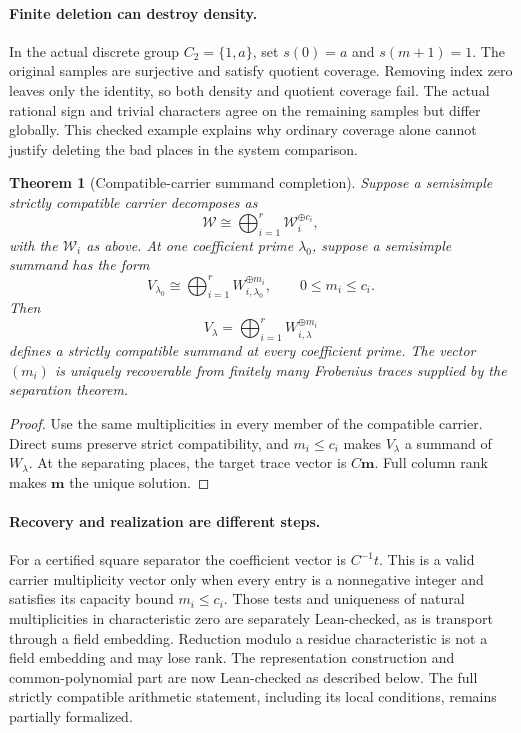\documentclass[11pt]{article}
\newtheorem{theorem}{Theorem}[section]
\theoremstyle{definition}
\theoremstyle{remark}
\begin{document}
\paragraph{Finite deletion can destroy density.}
In the actual discrete group $C_2=\{1,a\}$, set $s(0)=a$ and $s(m+1)=1$.
The original samples are surjective and satisfy quotient coverage. Removing
index zero leaves only the identity, so both density and quotient coverage fail.
The actual rational sign and trivial characters agree on the remaining samples
but differ globally. This checked example explains why ordinary coverage alone
cannot justify deleting the bad places in the system comparison.

\begin{theorem}[Compatible-carrier summand completion]
Suppose a semisimple strictly compatible carrier decomposes as
\[
\mathscr W
\cong
\bigoplus_{i=1}^{r}
\mathscr W_i^{\oplus c_i},
\]
with the \(\mathscr W_i\) as above.  At one coefficient prime \(\lambda_0\), suppose a semisimple summand has the form
\[
V_{\lambda_0}
\cong
\bigoplus_{i=1}^{r}
W_{i,\lambda_0}^{\oplus m_i},
\qquad
0\le m_i\le c_i.
\]
Then
\[
\boxed{
V_\lambda
=
\bigoplus_{i=1}^{r}
W_{i,\lambda}^{\oplus m_i}
}
\]
defines a strictly compatible summand at every coefficient prime.  The vector \((m_i)\) is uniquely recoverable from finitely many Frobenius traces supplied by the separation theorem.
\end{theorem}

\begin{proof}
Use the same multiplicities in every member of the compatible carrier.  Direct sums preserve strict compatibility, and \(m_i\le c_i\) makes \(V_\lambda\) a summand of \(W_\lambda\).  At the separating places, the target trace vector is \(C\bm m\).  Full column rank makes \(\bm m\) the unique solution.
\end{proof}

\paragraph{Recovery and realization are different steps.}
For a certified square separator the coefficient vector is $C^{-1}t$.
This is a valid carrier multiplicity vector only when every entry is a
nonnegative integer and satisfies its capacity bound $m_i\le c_i$.
Those tests and uniqueness of natural multiplicities in characteristic zero
are separately Lean-checked, as is transport through a field embedding.
Reduction modulo a residue characteristic is not a field embedding and may
lose rank. The representation construction and common-polynomial part are now
Lean-checked as described below. The full strictly compatible arithmetic
statement, including its local conditions, remains partially formalized.
\end{document}

